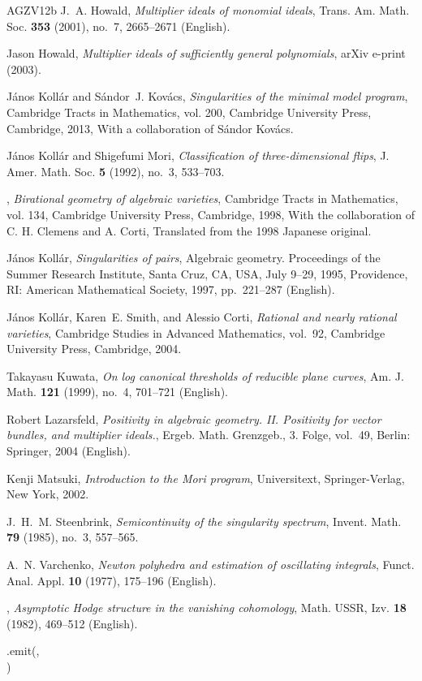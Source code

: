 \documentclass[a4paper, 12pt, oneside]{article}
\theoremstyle{plain}
\theoremstyle{definition}
\theoremstyle{remark}
\numberwithin{theorem}{section}
\numberwithin{table}{section}
\numberwithin{equation}{theorem}
\DeclareRobustCommand\ShowAffiliations[1]{%
  \ShowAffiliationsSignal.emit({#1})%
}
\begin{document}
\begin{thebibliography}{AGZV12b}
J.~A. Howald, \emph{Multiplier ideals of monomial ideals}, Trans. Am. Math.
  Soc. \textbf{353} (2001), no.~7, 2665--2671 (English).

Jason Howald, \emph{Multiplier ideals of sufficiently general polynomials},
  arXiv e-print (2003).

J\'{a}nos Koll\'{a}r and S\'{a}ndor~J. Kov\'{a}cs, \emph{Singularities of the
  minimal model program}, Cambridge Tracts in Mathematics, vol. 200, Cambridge
  University Press, Cambridge, 2013, With a collaboration of S\'{a}ndor
  Kov\'{a}cs.

J\'{a}nos Koll\'{a}r and Shigefumi Mori, \emph{Classification of
  three-dimensional flips}, J. Amer. Math. Soc. \textbf{5} (1992), no.~3,
  533--703.

\bysame, \emph{Birational geometry of algebraic varieties}, Cambridge Tracts in
  Mathematics, vol. 134, Cambridge University Press, Cambridge, 1998, With the
  collaboration of C. H. Clemens and A. Corti, Translated from the 1998
  Japanese original.

J{\'a}nos Koll{\'a}r, \emph{Singularities of pairs}, Algebraic geometry.
  Proceedings of the Summer Research Institute, Santa Cruz, CA, USA, July
  9--29, 1995, Providence, RI: American Mathematical Society, 1997,
  pp.~221--287 (English).

J\'{a}nos Koll\'{a}r, Karen~E. Smith, and Alessio Corti, \emph{Rational and
  nearly rational varieties}, Cambridge Studies in Advanced Mathematics,
  vol.~92, Cambridge University Press, Cambridge, 2004.

Takayasu Kuwata, \emph{On log canonical thresholds of reducible plane curves},
  Am. J. Math. \textbf{121} (1999), no.~4, 701--721 (English).

Robert Lazarsfeld, \emph{Positivity in algebraic geometry. {II}. {Positivity}
  for vector bundles, and multiplier ideals.}, Ergeb. Math. Grenzgeb., 3.
  Folge, vol.~49, Berlin: Springer, 2004 (English).

Kenji Matsuki, \emph{Introduction to the {M}ori program}, Universitext,
  Springer-Verlag, New York, 2002.

J.~H.~M. Steenbrink, \emph{Semicontinuity of the singularity spectrum}, Invent.
  Math. \textbf{79} (1985), no.~3, 557--565.

A.~N. Varchenko, \emph{Newton polyhedra and estimation of oscillating
  integrals}, Funct. Anal. Appl. \textbf{10} (1977), 175--196 (English).

\bysame, \emph{Asymptotic {Hodge} structure in the vanishing cohomology}, Math.
  USSR, Izv. \textbf{18} (1982), 469--512 (English).

\end{thebibliography}

\ShowAffiliations{\vspace{0.5\baselineskip},\\[1\baselineskip]}
\end{document}

